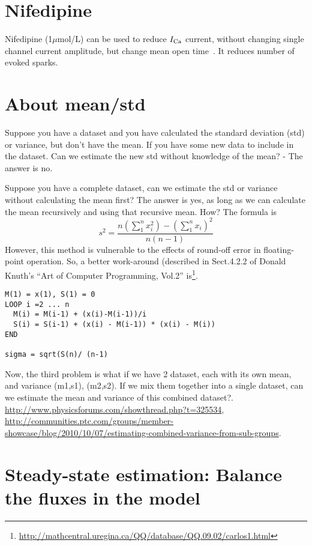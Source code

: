 \section{Nifedipine}
\label{sec:nifedipine}

Nifedipine (1$\mu$mol/L) can be used to reduce $I_{\text{Ca}}$ current, without changing
single channel current amplitude, but change mean open time~\citep{santana1996}.
It reduces number of evoked sparks. 

\section{About mean/std}
\label{sec:about-meanstd}

Suppose you have a dataset and you have calculated the standard
deviation (std) or variance, but don't have the mean. If you have some
new data to include in the dataset. Can we estimate the new std
without knowledge of the mean? - The answer is no.

Suppose you have a complete dataset, can we estimate the std or
variance without calculating the mean first? The answer is yes, as
long as we can calculate the mean recursively and using that recursive
mean. How? The formula is
\begin{equation}
  \label{eq:52}
  s^2 = \frac{n\left(\sum^n_1 x_i^2\right) - \left( \sum^n_1
      x_i\right)^2 } {n(n-1)}
\end{equation}
However, this method is vulnerable to the effects of round-off error
in floating-point operation. So, a better work-around (described in
Sect.4.2.2 of Donald Knuth's ``Art of Computer Programming, Vol.2''
is\footnote{\url{http://mathcentral.uregina.ca/QQ/database/QQ.09.02/carlos1.html}}.
\begin{verbatim}
M(1) = x(1), S(1) = 0
LOOP i =2 ... n
  M(i) = M(i-1) + (x(i)-M(i-1))/i
  S(i) = S(i-1) + (x(i) - M(i-1)) * (x(i) - M(i))
END

sigma = sqrt(S(n)/ (n-1)
\end{verbatim}


Now, the third problem is what if we have 2 dataset, each with its own
mean, and variance (m1,s1), (m2,s2). If we mix them together into a
single dataset, can we estimate the mean and variance of this combined
dataset?. \url{http://www.physicsforums.com/showthread.php?t=325534},
\url{http://communities.ptc.com/groups/member-showcase/blog/2010/10/07/estimating-combined-variance-from-sub-groups}. 

\section{Steady-state estimation: Balance the fluxes in the model}
\label{sec:steady_state}

